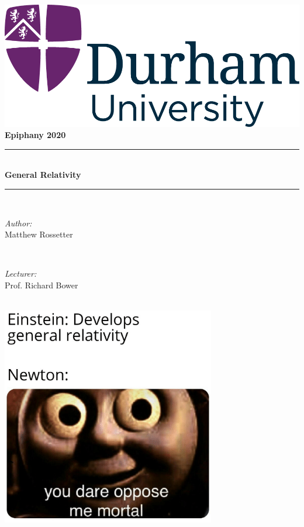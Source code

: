 \documentclass[a4paper, 11pt, normalem]{report}
\begin{document}
\begin{titlepage}
    \newcommand{\HRule}{\rule{\linewidth}{0.5mm}}
    \center
    {\includegraphics[scale=0.5]{../../logo0.png}\hfill{\Large\bfseries Epiphany 2020}}\\[2.5cm]
    \HRule \\[0.7cm]
    {\huge\bfseries General Relativity}\\[0.4cm]
    \HRule \\[1.5cm]

    \begin{minipage}{0.4\textwidth}
        \begin{flushleft} \large
            \emph{Author:} \\ Matthew Rossetter
        \end{flushleft}
    \end{minipage}~
    \begin{minipage}{0.4\textwidth}
        \begin{flushright} \large
            \emph{Lecturer:} \\ Prof. Richard Bower
        \end{flushright}
    \end{minipage}\\[2cm]
    \vfill
    \includegraphics[width=0.7\textwidth]{newt.png}\\[1cm]
    \vfill
\end{titlepage}
\tableofcontents
\end{document}

